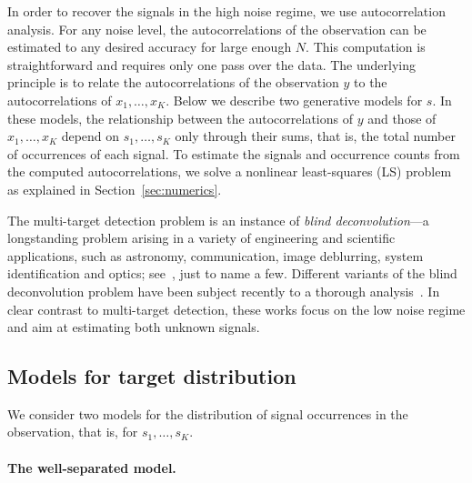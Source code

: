 \documentclass[12pt]{article}
\newcommand{\1}{\mathbf{1}}
\theoremstyle{plain}
\theoremstyle{definition}
\theoremstyle{remark}
\theoremstyle{plain}
\theoremstyle{remark}
\theoremstyle{plain}
\theoremstyle{plain}
\theoremstyle{plain}
\numberwithin{equation}{section}
\begin{document}
In order to recover the signals in the high noise regime, we use autocorrelation analysis.
For any noise level, the autocorrelations of the observation can be estimated to any desired accuracy for large enough $N$. 
This computation is straightforward and requires only one pass over the data.
The underlying principle is to relate the autocorrelations of the observation $y$ to the autocorrelations of $x_1,\ldots,x_K$.
Below we describe two generative models for $s$.  
In these models, the relationship between the autocorrelations of $y$ and those of $x_1,\ldots,x_K$ depend on $s_1,\ldots,s_K$ only through their sums, that is, the total number of occurrences of each signal.
To estimate the signals and occurrence counts from the computed autocorrelations, we solve a nonlinear least-squares (LS) problem as explained in Section~\ref{sec:numerics}. 

The multi-target detection problem  is an instance of  
\emph{blind deconvolution}---a longstanding problem arising in a variety of engineering and scientific applications, such as astronomy, communication, image deblurring, system identification and optics; see~\cite{jefferies1993restoration,shalvi1990new,ayers1988iterative,abed1997blind}, just to name a few. 
Different variants of the blind deconvolution problem have been subject recently to a thorough  analysis~\cite{ahmed2014blind,li2016identifiability,li2016rapid,lee2017blind,ling2017blind,kuo2019geometry}. In clear contrast to multi-target detection, these works focus on the low noise regime and aim at estimating both unknown signals.

\subsection*{Models for target distribution}

We consider two  models for the distribution of signal occurrences in the observation, that is, for $s_1, \ldots, s_K$.

\paragraph{The well-separated model.}

\end{document}
